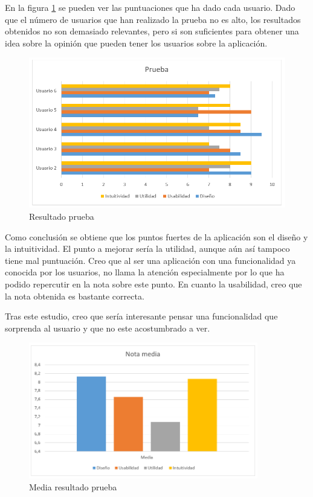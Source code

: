 \documentclass[a4paper, 12pt]{book}
\begin{document}
En la figura \ref{f:prueba_result} se pueden ver las puntuaciones que ha dado cada usuario. Dado que el n\'umero de usuarios que han realizado la prueba no es alto, los resultados obtenidos no son demasiado relevantes, pero si son suficientes para obtener una idea sobre la opini\'on que pueden tener los usuarios sobre la aplicaci\'on.

\begin{figure}[H]
  \centering
  \includegraphics[width=12cm, keepaspectratio]{img/prueba.png}
  \caption{Resultado prueba}
  \label{f:prueba_result}
\end{figure}

Como conclusi\'on se obtiene que los puntos fuertes de la aplicaci\'on son el dise\~no y la intuitividad. El punto a mejorar ser\'ia la utilidad, aunque a\'un as\'i tampoco tiene mal puntuaci\'on. Creo que al ser una aplicaci\'on con una funcionalidad ya conocida por los usuarios, no llama la atenci\'on especialmente por lo que ha podido repercutir en la nota sobre este punto. En cuanto la usabilidad, creo que la nota obtenida es bastante correcta. 

Tras este estudio, creo que ser\'ia interesante pensar una funcionalidad que sorprenda al usuario y que no este acostumbrado a ver.

\begin{figure}[H]
  \centering
  \includegraphics[width=10cm, keepaspectratio]{img/media.png}
  \caption{Media resultado prueba}
  \label{f:prueba-media}
\end{figure}
\end{document}
